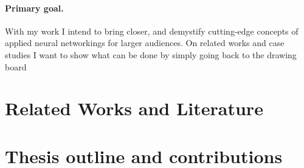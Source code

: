\paragraph{Primary goal.} With my work I intend to bring closer, and demystify cutting-edge concepts of applied neural networkings for larger audiences. 
On related works and case studies I want to show what can be done by simply going back to the drawing board

\section{Related Works and Literature}
\section{Thesis outline and contributions}






%
